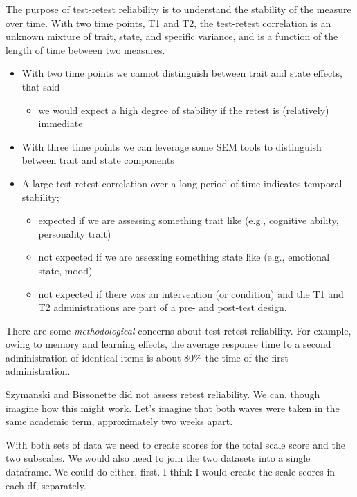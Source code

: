 \documentclass[
  english,
]{book}
\providecommand{\tightlist}{%
  \setlength{\itemsep}{0pt}\setlength{\parskip}{0pt}}
\begin{document}
The purpose of test-retest reliability is to understand the stability of the measure over time. With two time points, T1 and T2, the test-retest correlation is an unknown mixture of trait, state, and specific variance, and is a function of the length of time between two measures.

\begin{itemize}
\tightlist
\item
  With two time points we cannot distinguish between trait and state effects, that said

  \begin{itemize}
  \tightlist
  \item
    we would expect a high degree of stability if the retest is (relatively) immediate
  \end{itemize}
\item
  With three time points we can leverage some SEM tools to distinguish between trait and state components
\item
  A large test-retest correlation over a long period of time indicates temporal stability;

  \begin{itemize}
  \tightlist
  \item
    expected if we are assessing something trait like (e.g., cognitive ability, personality trait)
  \item
    not expected if we are assessing something state like (e.g., emotional state, mood)
  \item
    not expected if there was an intervention (or condition) and the T1 and T2 administrations are part of a pre- and post-test design.
  \end{itemize}
\end{itemize}

There are some \emph{methodological} concerns about test-retest reliability. For example, owing to memory and learning effects, the average response time to a second administration of identical items is about 80\% the time of the first administration.

Szymanski and Bissonette \citeyearpar{szymanski_perceptions_2020} did not assess retest reliability. We can, though imagine how this might work. Let's imagine that both waves were taken in the same academic term, approximately two weeks apart.

With both sets of data we need to create scores for the total scale score and the two subscales. We would also need to join the two datasets into a single dataframe. We could do either, first. I think I would create the scale scores in each df, separately.
\end{document}

